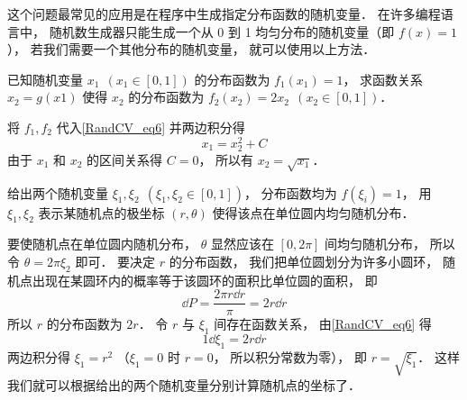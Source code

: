 这个问题最常见的应用是在程序中生成指定分布函数的随机变量． 在许多编程语言中， 随机数生成器只能生成一个从 0 到 1 均匀分布的随机变量（即 $f(x) = 1$）， 若我们需要一个其他分布的随机变量， 就可以使用以上方法．

\begin{exam}{}
已知随机变量 $x_1\ \ (x_1\in [0,1])$ 的分布函数为 $f_1(x_1) = 1$， 求函数关系 $x_2 = g(x1)$ 使得 $x_2$ 的分布函数为 $f_2(x_2) = 2x_2\ \ (x_2\in [0,1])$．

将 $f_1, f_2$ 代入\autoref{RandCV_eq6} 并两边积分得
\begin{equation}
x_1 = x_2^2 + C
\end{equation}
由于 $x_1$ 和 $x_2$ 的区间关系得 $C = 0$， 所以有 $x_2 = \sqrt{x_1}$．
\end{exam}

\begin{exam}{}\label{RandCV_ex3}
给出两个随机变量 $\xi_1, \xi_2\ \ (\xi_1, \xi_2\in [0,1])$， 分布函数均为 $f(\xi_i) = 1$， 用 $\xi_1, \xi_2$ 表示某随机点的极坐标 $(r,\theta)$ 使得该点在单位圆内均匀随机分布．

要使随机点在单位圆内随机分布， $\theta$ 显然应该在 $[0,2\pi]$ 间均匀随机分布， 所以令 $\theta = 2\pi\xi_2$ 即可． 要决定 $r$ 的分布函数， 我们把单位圆划分为许多小圆环， 随机点出现在某圆环内的概率等于该圆环的面积比单位圆的面积， 即
\begin{equation}
\dd{P} = \frac{2\pi r\dd{r}}{\pi} = 2r\dd{r}
\end{equation}
所以 $r$ 的分布函数为 $2r$． 令 $r$ 与 $\xi_1$ 间存在函数关系， 由\autoref{RandCV_eq6} 得
\begin{equation}
1\dd{\xi_1} = 2r\dd{r}
\end{equation}
两边积分得 $\xi_1 = r^2$ （$\xi_1 = 0$ 时 $r = 0$， 所以积分常数为零）， 即 $r = \sqrt{\xi_1}$． 这样我们就可以根据给出的两个随机变量分别计算随机点的坐标了．
\end{exam}